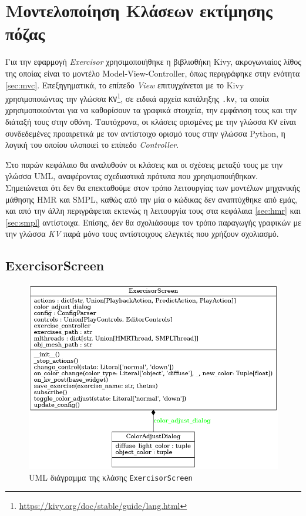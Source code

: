 \section{Μοντελοποίηση Κλάσεων εκτίμησης πόζας}

Για την εφαρμογή \textsl{Exercisor} χρησιμοποιήθηκε η βιβλιοθήκη Kivy, ακρογωνιαίος λίθος της οποίας είναι το μοντέλο Model-View-Controller, όπως περιγράφηκε στην ενότητα \ref{sec:mvc}. Επεξηγηματικά, το επίπεδο \textsl{View} επιτυγχάνεται με το Kivy χρησιμοποιώντας την γλώσσα \texttt{KV}\footnote{\href{https://kivy.org/doc/stable/guide/lang.html}{https://kivy.org/doc/stable/guide/lang.html}}, σε ειδικά αρχεία κατάληξης \texttt{.kv}, τα οποία χρησιμοποιούνται για να καθορίσουν τα γραφικά στοιχεία, την εμφάνιση τους και την διάταξή τους στην οθόνη. Ταυτόχρονα, οι κλάσεις ορισμένες με την γλώσσα \texttt{KV} είναι συνδεδεμένες προαιρετικά με τον αντίστοιχο ορισμό τους στην γλώσσα Python, η λογική του οποίου υλοποιεί το επίπεδο \textsl{Controller}.

Στο παρών κεφάλαιο θα αναλυθούν οι κλάσεις και οι σχέσεις μεταξύ τους με την γλώσσα UML, αναφέροντας σχεδιαστικά πρότυπα που χρησιμοποιήθηκαν. Σημειώνεται ότι δεν θα επεκταθούμε στον τρόπο λειτουργίας των μοντέλων μηχανικής μάθησης HMR και SMPL, καθώς από την μία ο κώδικας δεν αναπτύχθηκε από εμάς, και από την άλλη περιγράφεται εκτενώς η λειτουργία τους στα κεφάλαια \ref{sec:hmr} και \ref{sec:smpl} αντίστοιχα. Επίσης, δεν θα σχολιάσουμε τον τρόπο παραγωγής γραφικών με την γλώσσα \textsl{KV} παρά μόνο τους αντίστοιχους ελεγκτές που χρήζουν σχολιασμό.

\newpage
\subsection{ExercisorScreen}

\begin{figure}[h]
	\centering
	\includegraphics[scale=0.4]{images/chapter5/exercisor_uml.png}
	\caption{UML διάγραμμα της κλάσης \texttt{ExercisorScreen}}
	\label{fig:exercisor_uml}
\end{figure}

